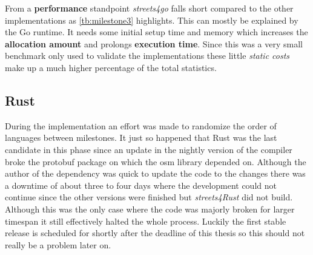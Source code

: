 From a \textbf{performance} standpoint \textit{streets4go} falls short compared to the other implementations as \autoref{tb:milestone3} highlights. This can mostly be explained by the Go runtime. It needs some initial setup time and memory which increases the \textbf{allocation amount} and prolongs \textbf{execution time}. Since this was a very small benchmark only used to validate the implementations these little \textit{static costs} make up a much higher percentage of the total statistics.

\subsection{Rust}
\label{subsec:Implementation::Verification::Rust}

During the implementation an effort was made to randomize the order of languages between milestones. It just so happened that Rust was the last candidate in this phase since an update in the nightly version of the compiler broke the \gls{protobuf} package on which the \gls{osm} library depended on. Although the author of the dependency was quick to update the code to the changes there was a downtime of about three to four days where the development could not continue since the other versions were finished but \textit{streets4Rust} did not build. Although this was the only case where the code was majorly broken for larger timespan it still effectively halted the whole process. Luckily the first stable release is scheduled for shortly after the deadline of this thesis so this should not really be a problem later on.


